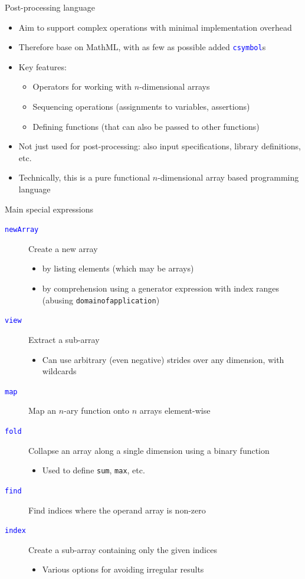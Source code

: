 \documentclass[t,xcolor={usenames,dvipsnames}]{beamer}
\newcommand{\subitem}[1]{\begin{itemize}[<.->]\item #1 \end{itemize}}
\newcommand{\csym}[1]{\textcolor{Blue}{\texttt{#1}}}
\begin{document}
\begin{frame}{Post-processing language}
\begin{itemize}
\item Aim to support complex operations with minimal implementation overhead
\item Therefore base on MathML, with as few as possible added \csym{csymbol}s
\item Key features:
  \begin{itemize}
  \item Operators for working with $n$-dimensional arrays
  \item Sequencing operations (assignments to variables, assertions)
  \item Defining functions (that can also be passed to other functions)
  \end{itemize}
\item Not just used for post-processing: also input specifications, library definitions, etc.
\item Technically, this is a pure functional $n$-dimensional array based programming language
\end{itemize}
\end{frame}

\begin{frame}{Main special expressions}
\footnotesize
\begin{description}
\item[\csym{newArray}] Create a new array
  \begin{itemize}
  \item by listing elements (which may be arrays)
  \item by \alert{comprehension} using a generator expression with index ranges
  (abusing \texttt{domainofapplication})
  \end{itemize}
\item[\csym{view}] Extract a sub-array
  \subitem{Can use arbitrary (even negative) strides over any dimension, with wildcards}
\item[\csym{map}] Map an $n$-ary function onto $n$ arrays element-wise
\item[\csym{fold}] Collapse an array along a single dimension using a binary function
  \subitem{Used to define \texttt{sum}, \texttt{max}, etc.}
\item[\csym{find}] Find indices where the operand array is non-zero
\item[\csym{index}] Create a sub-array containing only the given indices
  \subitem{Various options for avoiding irregular results}
\end{description}
\end{frame}
\end{document}
